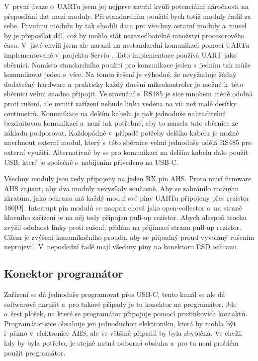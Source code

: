 V~první úvaze o~UARTu jsem jej nejprve zavrhl kvůli potenciální náročnosti na přeposílání dat mezi moduly.
Při standardním použití bych totiž moduly řadil za sebe.
Prvnímu modulu by tak chodili data pro všechny ostatní moduly a~musel by je přeposílat dál, což by mohlo stát nezanedbatelné množství procesorového času.
V~jisté chvíli jsem ale narazil na nestandardní komunikaci pomocí UARTu implementované v~projektu Servio \cite{Servio}.
Tato implementace používá UART jako sběrnici.
Namísto standardního použití pro komunikace jeden s~jedním tak může komunikovat jeden s~více.
Na tomto řešení je výhodné, že nevyžaduje žádný dodatečný hardware a~prakticky každý dnešní mikrokontroler je možné k~této sběrnici velmi snadno připojit.
Ve srovnání s~RS485 je sice mnohem méně odolná proti rušení, ale uvnitř zařízení nebude linka vedena na víc než malé desítky centimetrů.
Komunikace na delším kabelu je pak jednoduše nahraditelná bezdrátovou komunikací a~není tak potřebné, aby to musela tato sběrnice ze základu podporovat.
Každopádně v~případě potřeby delšího kabelu je možné navrhnout externí modul, který s~této sběrnice velmi jednoduše udělá RS485 pro externí využití.
Alternativně by se pro komunikaci na delším kabelu dalo použít USB, které je společně s~nabíjením přivedeno na USB-C.

Všechny moduly jsou tedy připojeny na jeden RX pin AHS.
Proto musí firmware AHS zajistit, aby dva moduly nevysílaly současně.
Aby se zabránilo možným zkratům, jako ochranu má každý modul své piny UARTu připojeny přes rezistor \(180\-[\Omega]\).
Interrupt pin modulů se naopak chová jako open-collector a~na straně hlavního zařízení je na něj tedy připojen pull-up rezistor.
Abych alespoň trochu zvýšil odolnost linky proti rušení, přidám na přijímací stranu pull-up rezistor.
Cílem je zvýšení komunikačního proudu, aby se případný proud vyvolaný rušením neprojevil.
V~neposlední řadě mají všechny piny na konektoru ESD ochranu.

\newpage
\subsection{Konektor programátor}
Zařízení se dá jednoduše programovat přes USB-C, tento kanál se ale dá softwarově narušit a~pro takové případy je tu konektor na programátor.
Jde o~šest plošek, na které se programátor připojuje pomocí pružinkovích kontaktů.
Programátor sice obsahuje jen jednoduchou elektroniku, která by mohla být i~přímo v~elektronice AHS, ale ve většině případů by byla zbytečná.
Ve chvíli, kdy by byla potřeba, je stejně nutná odborná obsluha a~pro tu není problém použít programátor.

